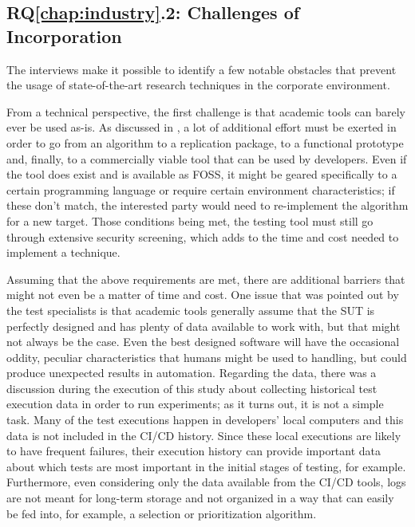 \subsection{RQ\ref{chap:industry}.2: Challenges of Incorporation}
\label{sec:ind_rq2}

The interviews make it possible to identify a few notable obstacles that prevent the usage of state-of-the-art research techniques in the corporate environment.

From a technical perspective, the first challenge is that academic tools can barely ever be used as-is.
As discussed in , a lot of additional effort must be exerted in order to go from an algorithm to a replication package, to a functional prototype and, finally, to a commercially viable tool that can be used by developers.
Even if the tool does exist and is available as FOSS, it might be geared specifically to a certain programming language or require certain environment characteristics; if these don't match, the interested party would need to re-implement the algorithm for a new target.
Those conditions being met, the testing tool must still go through extensive security screening, which adds to the time and cost needed to implement a technique.

Assuming that the above requirements are met, there are additional barriers that might not even be a matter of time and cost.
One issue that was pointed out by the test specialists is that academic tools generally assume that the SUT is perfectly designed and has plenty of data available to work with, but that might not always be the case.
Even the best designed software will have the occasional oddity, peculiar characteristics that humans might be used to handling, but could produce unexpected results in automation.
Regarding the data, there was a discussion during the execution of this study about collecting historical test execution data in order to run experiments; as it turns out, it is not a simple task.
Many of the test executions happen in developers' local computers and this data is not included in the CI/CD history.
Since these local executions are likely to have frequent failures, their execution history can provide important data about which tests are most important in the initial stages of testing, for example.
Furthermore, even considering only the data available from the CI/CD tools, logs are not meant for long-term storage and not organized in a way that can easily be fed into, for example, a selection or prioritization algorithm.

